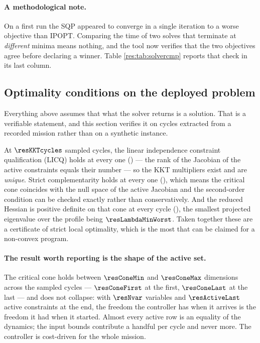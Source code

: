 \documentclass[11pt,a4paper]{article}
\begin{document}
\paragraph{A methodological note.} On a first run the SQP appeared to converge in a single iteration to a
worse objective than IPOPT. Comparing the time of two solves that terminate at \emph{different} minima means
nothing, and the tool now verifies that the two objectives agree before declaring a winner. Table
\ref{res:tab:solvercmp} reports that check in its last column.

\subsection{Optimality conditions on the deployed problem}
\label{sec:kkt}

Everything above assumes that what the solver returns is a solution. That is a verifiable statement, and this
section verifies it on cycles extracted from a recorded mission rather than on a synthetic instance.

\begin{table}[htbp]
  \centering
  \small
  \caption{%
  Optimality diagnostics at sampled cycles of the recorded run \resBag. ``active'' counts equalities and
  active bounds together; ``rank'' is the rank of the Jacobian of the active constraints, so LICQ holds
  when the two coincide.}
  \label{res:tab:kkt}
\end{table}

At $\resKKTcycles$ sampled cycles, the linear independence constraint qualification (LICQ) holds at every one (\resLICQalways) --- the rank of the Jacobian of
the active constraints equals their number --- so the KKT multipliers exist and are \emph{unique}. Strict
complementarity holds at every one (\resStrictAlways), which means the critical cone coincides with the null
space of the active Jacobian and the second-order condition can be checked exactly rather than
conservatively. And the reduced Hessian is positive definite on that cone at every cycle
(\resSOCalways), the smallest projected eigenvalue over the profile being $\resLambdaMinWorst$. Taken
together these are a certificate of strict local optimality, which is the most that can be claimed for a
non-convex program.

\paragraph{The result worth reporting is the shape of the active set.} The critical cone holds between
$\resConeMin$ and $\resConeMax$ dimensions across the sampled cycles --- $\resConeFirst$ at the first,
$\resConeLast$ at the last --- and does not collapse: with $\resNvar$ variables and $\resActiveLast$ active
constraints at the end, the freedom the controller has when it arrives is the freedom it had when it
started. Almost every active row is an equality of the dynamics; the input bounds contribute a handful per
cycle and never more. The controller is cost-driven for the whole mission.
\end{document}
